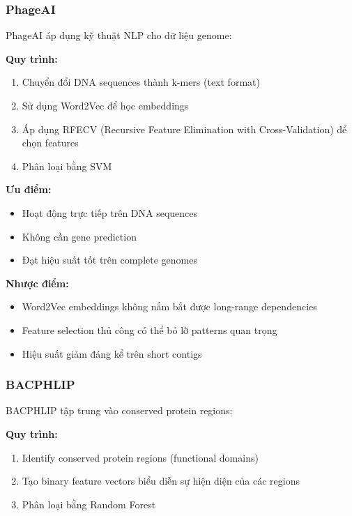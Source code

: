 \subsubsection{PhageAI}

PhageAI \cite{tynecki2020phageai} áp dụng kỹ thuật NLP cho dữ liệu genome:

\textbf{Quy trình:}
\begin{enumerate}
    \item Chuyển đổi DNA sequences thành k-mers (text format)
    \item Sử dụng Word2Vec để học embeddings
    \item Áp dụng RFECV (Recursive Feature Elimination with Cross-Validation) để chọn features
    \item Phân loại bằng SVM
\end{enumerate}

\textbf{Ưu điểm:}
\begin{itemize}
    \item Hoạt động trực tiếp trên DNA sequences
    \item Không cần gene prediction
    \item Đạt hiệu suất tốt trên complete genomes
\end{itemize}

\textbf{Nhược điểm:}
\begin{itemize}
    \item Word2Vec embeddings không nắm bắt được long-range dependencies
    \item Feature selection thủ công có thể bỏ lỡ patterns quan trọng
    \item Hiệu suất giảm đáng kể trên short contigs
\end{itemize}

\subsubsection{BACPHLIP}

BACPHLIP \cite{hockenberry2021bacphlip} tập trung vào conserved protein regions:

\textbf{Quy trình:}
\begin{enumerate}
    \item Identify conserved protein regions (functional domains)
    \item Tạo binary feature vectors biểu diễn sự hiện diện của các regions
    \item Phân loại bằng Random Forest
\end{enumerate}

